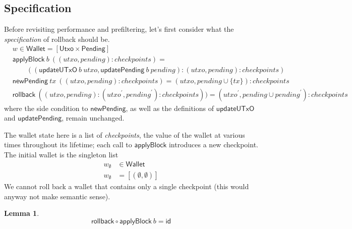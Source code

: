 \documentclass{article}
\newtheorem{lemma}{Lemma}
\begin{document}
\subsection{Specification}
\label{sec:rollback_spec}

Before revisiting performance and prefiltering, let's first consider what
the \emph{specification} of rollback should be.
%
\begin{align*}
& w \in \mathsf{Wallet} = [\mathsf{Utxo} \times \mathsf{Pending}] \\
& \mathsf{applyBlock} ~ b ~ ((\mathit{utxo}, \mathit{pending}) : \mathit{checkpoints}) = \\
& \qquad (( \mathsf{updateUTxO} ~ b ~ \mathit{utxo}
         , \mathsf{updatePending} ~ b ~ \mathit{pending}
         )
         : (\mathit{utxo}, \mathit{pending}) : \mathit{checkpoints}
         ) \\
& \mathsf{newPending} ~ tx ~ ((\mathit{utxo}, \mathit{pending}) : \mathit{checkpoints}) = (\mathit{utxo}, pending \cup \{ tx \} ) : \mathit{checkpoints} \\
& \mathsf{rollback} ~ ((\mathit{utxo}, \mathit{pending}) :  (\mathit{utxo}^\prime, \mathit{pending}^\prime) : \mathit{checkpoints})) =
     (\mathit{utxo}^\prime, \mathit{pending} \cup \mathit{pending}^\prime) : \mathit{checkpoints}
\end{align*}
%
where the side condition to $\mathsf{newPending}$, as well as the definitions
of $\mathsf{updateUTxO}$ and $\mathsf{updatePending}$, remain unchanged.

The wallet state here is a list of \emph{checkpoints}, the value of the wallet
at various times throughout its lifetime; each call to $\mathsf{applyBlock}$
introduces a new checkpoint. The initial wallet is the singleton list
%
\begin{equation}
\begin{split}
w_\emptyset & \in \mathsf{Wallet} \\
w_\emptyset & = [(\emptyset, \emptyset)]
\end{split}
\end{equation}
%
We cannot roll back a wallet that contains only a single checkpoint
(this would anyway not make semantic sense).

\begin{lemma} \label{lemma:rollback_applyBlock_id}
\begin{equation*}
\mathsf{rollback} \circ \mathsf{applyBlock} ~ b = \mathsf{id}
\end{equation*}
\end{lemma}
\end{document}
